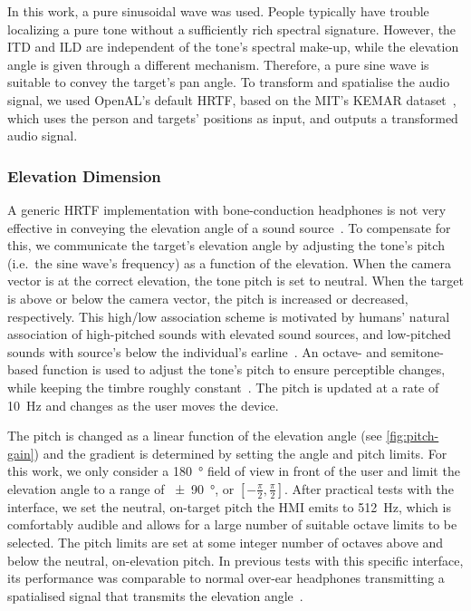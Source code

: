 \documentclass[acmsmall]{acmart}
\begin{document}
In this work, a pure sinusoidal wave was used. 
People typically have trouble localizing a pure tone without a sufficiently rich spectral signature.
However, the ITD and ILD are independent of the tone's spectral make-up, while the elevation angle is given through a different mechanism.
Therefore, a pure sine wave is suitable to convey the target's pan angle.
To transform and spatialise the audio signal, we used OpenAL's default HRTF, based on the MIT's KEMAR dataset~\citep{hiebert2005openal}, which uses the person and targets' positions as input, and outputs a transformed audio signal.

\subsubsection{Elevation Dimension}

A generic HRTF implementation with bone-conduction headphones is not very effective in conveying the elevation angle of a sound source~\citep{macdonald2006spatial,schonstein2008comparison}.
To compensate for this, we communicate the target's elevation angle by adjusting the tone's pitch (i.e.\ the sine wave's frequency) as a function of the elevation. 
When the camera vector is at the correct elevation, the tone pitch is set to neutral.
When the target is above or below the camera vector, the pitch is increased or decreased, respectively.
This high/low association scheme is motivated by humans' natural association of high-pitched sounds with elevated sound sources, and low-pitched sounds with source's below the individual's earline~\citep{pratt1930spatial,blauert1997spatial}.
An octave- and semitone-based function is used to adjust the tone's pitch to ensure perceptible changes, while keeping the timbre roughly constant~\citep{shepard1964circularity}.
The pitch is updated at a rate of \SI{10}{\hertz} and changes as the user moves the device.

The pitch is changed as a linear function of the elevation angle (see \cref{fig:pitch-gain}) and the gradient is determined by setting the angle and pitch limits.
For this work, we only consider a \SI{180}{\degree} field of view in front of the user and limit the elevation angle to a range of \SI{\pm90}{\degree}, or $[-\frac{\pi}{2}, \frac{\pi}{2}]$.
After practical tests with the interface, we set the neutral, on-target pitch the HMI emits to \SI{512}{\hertz}, which is comfortably audible and allows for a large number of suitable octave limits to be selected.
The pitch limits are set at some integer number of octaves above and below the neutral, on-elevation pitch.
In previous tests with this specific interface, its performance was comparable to normal over-ear headphones transmitting a spatialised signal that transmits the elevation angle~\cite{lock2019bone}.
\end{document}
